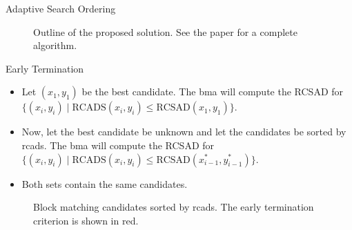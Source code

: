\documentclass[10pt]{beamer}
\begin{document}
\begin{frame}[t]
\begin{columns}[t, onlytextwidth]
\begin{column}{0.32\textwidth}
\begin{block}{Adaptive Search Ordering}
            \begin{figure}[htb]
                \vspace{-2.5em}
                \centering
                
                \vspace{-1.5em}
                \caption{Outline of the proposed solution. See the paper for a complete algorithm.}
                \label{fig:outline}
            \end{figure}
        \end{block}
        
        \begin{block}{Early Termination}
             \begin{itemize}
            \item Let $(x_1,y_1)$ be the best candidate. The \gls{bma} will compute the RCSAD for $\{(x_i,y_i) \mid \text{RCADS}(x_i,y_i) \leqslant \text{RCSAD}(x_1,y_1)\}$.
            \item Now, let the best candidate be unknown and let the candidates be sorted by \gls{rcads}. The \gls{bma} will compute the RCSAD for $\{(x_i,y_i) \mid \text{RCADS}(x_i,y_i) \leqslant \text{RCSAD}(x^*_{i-1},y^*_{i-1})\}$.
            \item Both sets contain the same candidates.
                
            \end{itemize}         
            
            \begin{figure}[htb]
                \vspace{-2em}
                \centering
                    
                \vspace{-2em}
                \caption{Block matching candidates sorted by \gls{rcads}. The early termination criterion is shown in red.}
                \label{fig:Sorted}
            \end{figure}
             
        \end{block}
    \end{column}
        

\end{columns}
\end{frame}
\end{document}
